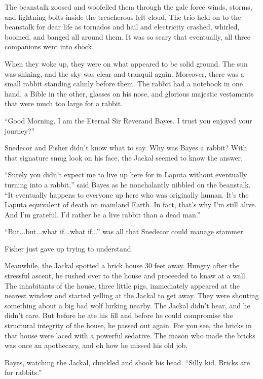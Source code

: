 \documentclass{article}
\begin{document}
The beanstalk zoosed and woofelled them through the gale force winds, storms, and lightning bolts inside the treacherous left cloud. The trio held on to the beanstalk for dear life as tornados and hail and electricity crashed, whirled, boomed, and banged all around them. It was so scary that eventually, all three companions went into shock.  



When they woke up, they were on what appeared to be solid ground. The sun was shining, and the sky was clear and tranquil again. Moreover, there was a small rabbit standing calmly before them. The rabbit had a notebook in one hand, a Bible in the other, glasses on his nose, and glorious majestic vestaments that were much too large for a rabbit. 

``Good Morning. I am the Eternal Sir Reverand Bayes. I trust you enjoyed your journey?'' 

Snedecor and Fisher didn't know what to say. Why was Bayes a rabbit? With that signature smug look on his face, the Jackal seemed to know the answer. 

``Surely you didn't expect me to live up here for in Laputa without eventually turning into a rabbit,'' said Bayes as he nonchalantly nibbled on the beanstalk. ``It eventually happens to everyone up here who was originally human. It's the Laputa equivalent of death on mainland Earth. In fact, that's why I'm still alive. And I'm grateful. I'd rather be a live rabbit than a dead man.'' 

``But...but...what if...what if...'' was all that Snedecor could manage stammer. 

Fisher just gave up trying to understand. 

Meanwhile, the Jackal spotted a brick house 30 feet away. Hungry after the stressful ascent, he rushed over to the house and proceeded to knaw at a wall. The inhabitants of the house, three little pigs, immediately appeared at the nearest window and started yelling at the Jackal to get away. They were shouting something about a big bad wolf lurking nearby. The Jackal didn't hear, and he didn't care. But before he ate his fill and before he could compromise the structural integrity of the house, he passed out again. For you see, the bricks in that house were laced with a powerful sedative. The mason who made the bricks was once an apothecary, and oh how he missed his old job. 

Bayes, watching the Jackal, chuckled and shook his head. ``Silly kid. Bricks are for rabbits.'' 
\end{document}
